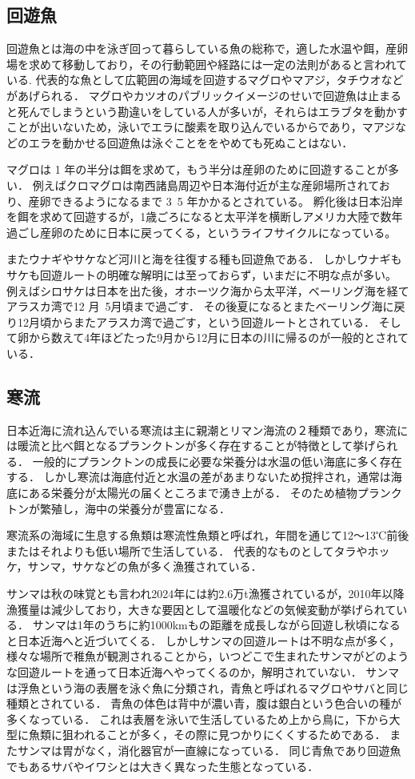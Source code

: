 \documentclass[12pt,a4j,titlepage]{ltjsarticle}
\begin{document}
\subsection{回遊魚}
回遊魚とは海の中を泳ぎ回って暮らしている魚の総称で，適した水温や餌，産卵場を求めて移動しており，その行動範囲や経路には一定の法則があると言われている\cite{kairyuu}.
代表的な魚として広範囲の海域を回遊するマグロやマアジ，タチウオなどがあげられる．
マグロやカツオのパブリックイメージのせいで回遊魚は止まると死んでしまうという勘違いをしている人が多いが，それらはエラブタを動かすことが出いないため，泳いでエラに酸素を取り込んでいるからであり，マアジなどのエラを動かせる回遊魚は泳ぐことををやめても死ぬことはない．\par
マグロは 1 年の半分は餌を求めて，もう半分は産卵のために回遊することが多い．
例えばクロマグロは南西諸島周辺や日本海付近が主な産卵場所されており、産卵できるようになるまで 3~5 年かかるとされている。
孵化後は日本沿岸を餌を求めて回遊するが，1歳ごろになると太平洋を横断しアメリカ大陸で数年過ごし産卵のために日本に戻ってくる，というライフサイクルになっている。\par
またウナギやサケなど河川と海を往復する種も回遊魚である．
しかしウナギもサケも回遊ルートの明確な解明には至っておらず，いまだに不明な点が多い。
例えばシロサケは日本を出た後，オホーツク海から太平洋，ベーリング海を経てアラスカ湾で12 月~5月頃まで過ごす．
その後夏になるとまたベーリング海に戻り12月頃からまたアラスカ湾で過ごす，という回遊ルートとされている．
そして卵から数えて4年ほどたった9月から12月に日本の川に帰るのが一般的とされている．
\subsection{寒流}
日本近海に流れ込んでいる寒流は主に親潮とリマン海流の２種類であり，寒流には暖流と比べ餌となるプランクトンが多く存在することが特徴として挙げられる\cite{kairyuu}．
一般的にプランクトンの成長に必要な栄養分は水温の低い海底に多く存在する．
しかし寒流は海底付近と水温の差があまりないため撹拌され，通常は海底にある栄養分が太陽光の届くところまで湧き上がる．
そのため植物プランクトンが繁殖し，海中の栄養分が豊富になる．\par
寒流系の海域に生息する魚類は寒流性魚類と呼ばれ，年間を通じて12〜13℃前後またはそれよりも低い場所で生活している．
代表的なものとしてタラやホッケ，サンマ，サケなどの魚が多く漁獲されている．\par
サンマは秋の味覚とも言われ2024年には約2.6万t漁獲されているが，2010年以降漁獲量は減少しており，大きな要因として温暖化などの気候変動が挙げられている\cite{huryou}．
サンマは1年のうちに約1000kmもの距離を成長しながら回遊し秋頃になると日本近海へと近づいてくる．
しかしサンマの回遊ルートは不明な点が多く，様々な場所で稚魚が観測されることから，いつどこで生まれたサンマがどのような回遊ルートを通って日本近海へやってくるのか，解明されていない．
サンマは浮魚という海の表層を泳ぐ魚に分類され，青魚と呼ばれるマグロやサバと同じ種類とされている．
青魚の体色は背中が濃い青，腹は銀白という色合いの種が多くなっている．
これは表層を泳いで生活しているため上から鳥に，下から大型に魚類に狙われることが多く，その際に見つかりにくくするためである\cite{iro}．
またサンマは胃がなく，消化器官が一直線になっている．
同じ青魚であり回遊魚でもあるサバやイワシとは大きく異なった生態となっている．
\end{document}
